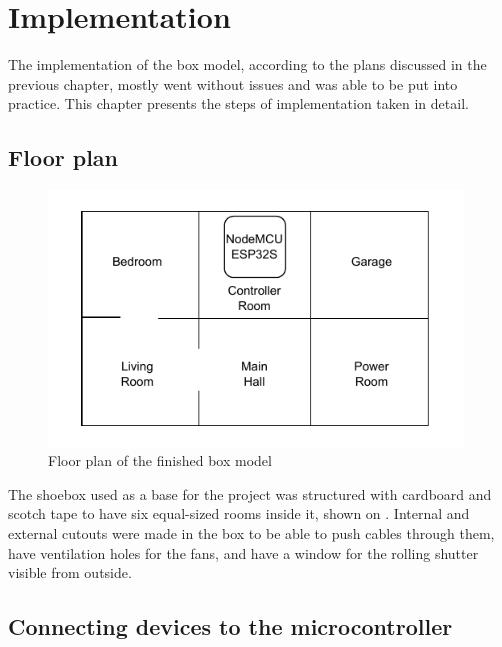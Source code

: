 \chapter{Implementation}

The implementation of the box model, according to the plans discussed in the previous chapter, mostly went without issues and was able to be put into practice. This chapter presents the steps of implementation taken in detail.

\section{Floor plan}

\begin{figure}[!ht]
    \centering
    \includegraphics[page=1,keepaspectratio,width=110mm]{figures/box_floorplan.drawio.pdf}
    \caption{Floor plan of the finished box model}
    \label{fig:BoxFloorplan}
\end{figure}

The shoebox used as a base for the project was structured with cardboard and scotch tape to have six equal-sized rooms inside it, shown on . Internal and external cutouts were made in the box to be able to push cables through them, have ventilation holes for the fans, and have a window for the rolling shutter visible from outside.

\section{Connecting devices to the microcontroller}

